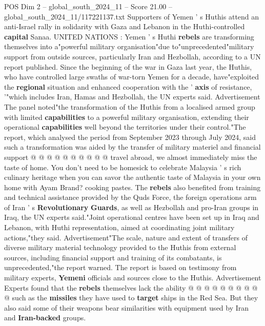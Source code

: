 \begin{textsample}{POS Dim 2 – global\_south\_2024\_11 – Score 21.00 – global\_south\_2024\_11/117221137.txt}  \label{ex:f2_pos_173}
Supporters of Yemen ' s Huthis attend an anti-Israel rally in solidarity with Gaza and Lebanon in the Huthi-controlled \textbf{capital} Sanaa.
UNITED NATIONS : Yemen ' s Huthi \textbf{rebels} are transforming themselves into a"powerful military organisation"due to"unprecedented"military support from outside sources, particularly Iran and Hezbollah, according to a UN report published.
Since the beginning of the war in Gaza last year, the Huthis, who have controlled large swaths of war-torn Yemen for a decade, have"exploited the \textbf{regional} situation and enhanced cooperation with the ' \textbf{axis} of resistance, '"which includes Iran, Hamas and Hezbollah, the UN experts said.
Advertisement The panel noted"the transformation of the Huthis from a localised armed group with limited \textbf{capabilities} to a powerful military organisation, extending their operational \textbf{capabilities} well beyond the territories under their control."The report, which analysed the period from September 2023 through July 2024, said such a transformation was aided by the transfer of military materiel and financial support @ @ @ @ @ @ @ @ @ @ travel abroad, we almost immediately miss the taste of home.
You don't need to be homesick to celebrate Malaysia ' s rich culinary heritage when you can savor the authentic taste of Malaysia in your own home with Ayam Brand? cooking pastes.
The \textbf{rebels} also benefited from training and technical assistance provided by the Quds Force, the foreign operations arm of Iran ' s \textbf{Revolutionary} \textbf{Guards}, as well as Hezbollah and pro-Iran groups in Iraq, the UN experts said."Joint operational centres have been set up in Iraq and Lebanon, with Huthi representation, aimed at coordinating joint military actions,"they said.
Advertisement"The scale, nature and extent of transfers of diverse military material technology provided to the Huthis from external sources, including financial support and training of its combatants, is unprecedented,"the report warned.
The report is based on testimony from military experts, \textbf{Yemeni} officials and sources close to the Huthis.
Advertisement Experts found that the \textbf{rebels} themselves lack the ability @ @ @ @ @ @ @ @ @ @ such as the \textbf{missiles} they have used to \textbf{target} ships in the Red Sea.
But they also said some of their weapons bear similarities with equipment used by Iran and \textbf{Iran-backed} groups.

\end{textsample}
